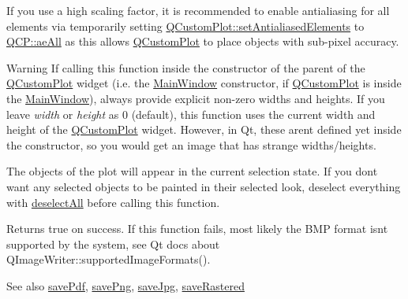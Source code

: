 If you use a high scaling factor, it is recommended to enable antialiasing for all elements via temporarily setting \hyperlink{class_q_custom_plot_af6f91e5eab1be85f67c556e98c3745e8}{Q\+Custom\+Plot\+::set\+Antialiased\+Elements} to \hyperlink{namespace_q_c_p_ae55dbe315d41fe80f29ba88100843a0caa897c232a0ffc8368e7c100ffc59ef31}{Q\+C\+P\+::ae\+All} as this allows \hyperlink{class_q_custom_plot}{Q\+Custom\+Plot} to place objects with sub-\/pixel accuracy.

\begin{DoxyWarning}{Warning}
If calling this function inside the constructor of the parent of the \hyperlink{class_q_custom_plot}{Q\+Custom\+Plot} widget (i.\+e. the \hyperlink{class_main_window}{Main\+Window} constructor, if \hyperlink{class_q_custom_plot}{Q\+Custom\+Plot} is inside the \hyperlink{class_main_window}{Main\+Window}), always provide explicit non-\/zero widths and heights. If you leave {\itshape width} or {\itshape height} as 0 (default), this function uses the current width and height of the \hyperlink{class_q_custom_plot}{Q\+Custom\+Plot} widget. However, in Qt, these aren\textquotesingle{}t defined yet inside the constructor, so you would get an image that has strange widths/heights.
\end{DoxyWarning}
The objects of the plot will appear in the current selection state. If you don\textquotesingle{}t want any selected objects to be painted in their selected look, deselect everything with \hyperlink{class_q_custom_plot_a9d4808ab925b003054085246c92a257c}{deselect\+All} before calling this function.

Returns true on success. If this function fails, most likely the B\+MP format isn\textquotesingle{}t supported by the system, see Qt docs about Q\+Image\+Writer\+::supported\+Image\+Formats().

\begin{DoxySeeAlso}{See also}
\hyperlink{class_q_custom_plot_a632da44c6d94ea8b271eb483b08b5114}{save\+Pdf}, \hyperlink{class_q_custom_plot_a7636261aff1f6d25c9da749ece3fc8b8}{save\+Png}, \hyperlink{class_q_custom_plot_a490c722092d1771e8ce4a7a73dfd84ab}{save\+Jpg}, \hyperlink{class_q_custom_plot_ab528b84cf92baabe29b1d0ef2f77c93e}{save\+Rastered} 
\end{DoxySeeAlso}
\hypertarget{class_q_custom_plot_a490c722092d1771e8ce4a7a73dfd84ab}{}\label{class_q_custom_plot_a490c722092d1771e8ce4a7a73dfd84ab} 
